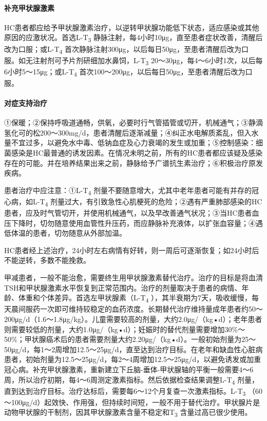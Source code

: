 \paragraph{补充甲状腺激素}

HC患者都应给予甲状腺激素治疗，以逆转甲状腺功能低下状态，适应感染或其他原因的应激状况。首选L-T\textsubscript{3}
静脉注射，每4小时10μg，直至患者症状改善，清醒后改为口服；或L-T\textsubscript{4}
首次静脉注射300μg，以后每日50μg，至患者清醒后改为口服。如无注射剂可予片剂研细加水鼻饲，L-T\textsubscript{3}
20～30μg，每4～6小时1次，以后每6小时5～15μg；或L-T\textsubscript{4}
首次100～200μg，以后每日50μg，至患者清醒后改为口服。

\paragraph{对症支持治疗}

①保暖；②保持呼吸道通畅，供氧，必要时行气管插管或切开，机械通气；③静滴氢化可的松200～300mg/d，患者清醒后逐渐减量；④纠正水电解质紊乱，但入水量不宜过多，以避免水中毒、低钠血症及心力衰竭的发生或加重；⑤控制感染：细菌感染是HC最普通的诱发因素。在情况未明之前，所有的HC患者都应该疑及感染存在的可能。并在培养结果出来之前，静脉给予广谱抗生素治疗；⑥积极治疗原发疾病。

患者治疗中应注意：①L-T\textsubscript{4}
剂量不要随意增大，尤其中老年患者可能有并存的冠心病，如L-T\textsubscript{4}
剂量过大，有引致急性心肌梗死的危险；②遇有严重肺部感染的HC患者，应及时气管切开，并使用机械通气，以及早改善通气状况；③当HC患者血压下降时，切勿随意使用血管性升压药，而应静脉补充液体，以扩张血容量；④遇低体温的患者，切勿随意从外部加温。

HC患者经上述治疗，24小时左右病情有好转，则一周后可逐渐恢复；如24小时后不能逆转，多数不能挽救。

甲减患者，一般不能治愈，需要终生用甲状腺激素替代治疗。治疗的目标是将血清TSH和甲状腺激素水平恢复到正常范围内。治疗的剂量取决于患者的病情、年龄、体重和个体差异。首选左甲状腺素（L-T\textsubscript{4}
），其半衰期为7天，吸收缓慢，每天晨间服药一次即可维持较稳定的血药浓度。长期替代治疗维持量成年患者约50～200μg/d（1.6～1.8μg/kg）。儿童需要较高的剂量，大约2.0μg/（kg•d）；老年患者则需要较低的剂量，大约1.0μg/（kg•d）；妊娠时的替代剂量需要增加30\%～50\%；甲状腺癌术后的患者需要剂量大约2.20μg/（kg•d）。一般初始剂量为25～50μg/d，每1～2周增加12.5～25μg/d，直至达到治疗目标。在老年和缺血性心脏病患者，初始剂量为12.5～25μg/d，每2～4周增加12.5～25μg/d，以避免诱发或加重冠心病。补充甲状腺激素，重新建立下丘脑-垂体-甲状腺轴的平衡一般需要4～6周，所以治疗初期，每4～6周测定激素指标。然后依据检查结果调整L-T\textsubscript{4}
剂量，直到达到治疗目标。治疗达标后，需要每6～12个月复查一次激素指标。L-T\textsubscript{3}
（60～100μg/d）起效快、作用强，但持续时间短，一般不用于替代治疗。甲状腺片是动物甲状腺的干制剂，因其甲状腺激素含量不稳定和T\textsubscript{3}
含量过高已很少使用。

